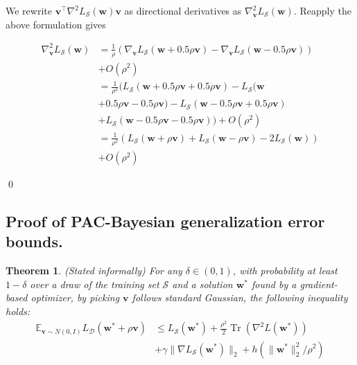 \documentclass[letterpaper]{article} %
\theoremstyle{plain}
\newtheorem{theorem}{Theorem}
\theoremstyle{definition}
\begin{document}
We rewrite $\boldsymbol{v}^{\top} \nabla^2 L_{\mathcal{S}}(\boldsymbol{w}) \boldsymbol{v} $ as directional derivatives as $\nabla_{\boldsymbol{v}}^{2} L_{\mathcal{S}}(\boldsymbol{w})$. Reapply the above formulation gives

\begin{align*}
    \nabla_{\boldsymbol{v}}^{2} L_{\mathcal{S}}(\boldsymbol{w}) &= \frac{1}{\rho} (\nabla_{\boldsymbol{v}} L_{\mathcal{S}}(\boldsymbol{w} + 0.5\rho\boldsymbol{v})- \nabla_{\boldsymbol{v}} L_{\mathcal{S}}(\boldsymbol{w} - 0.5\rho\boldsymbol{v})) \\
    &+O\left(\rho^2\right) \\
    &= \frac{1}{\rho^2} (L_{\mathcal{S}}(\boldsymbol{w} + 0.5\rho\boldsymbol{v}+ 0.5\rho\boldsymbol{v}) - L_{\mathcal{S}}(\boldsymbol{w}\\
    & + 0.5\rho\boldsymbol{v}- 0.5\rho\boldsymbol{v}) - L_{\mathcal{S}}(\boldsymbol{w} - 0.5\rho\boldsymbol{v} + 0.5\rho\boldsymbol{v}) \\
    &+ L_{\mathcal{S}}(\boldsymbol{w} - 0.5\rho\boldsymbol{v} - 0.5\rho\boldsymbol{v}))+O\left(\rho^2\right) \\
    &= \frac{1}{\rho^2} (L_{\mathcal{S}}(\boldsymbol{w} + \rho\boldsymbol{v})+ L_{\mathcal{S}}(\boldsymbol{w} -\rho\boldsymbol{v})- 2L_{\mathcal{S}}(\boldsymbol{w})) \\
    &+O\left(\rho^2\right)
\end{align*}

\qed

\subsection{Proof of PAC-Bayesian generalization error bounds.}
\begin{theorem} \label{theorem:bound}
(Stated informally) For any $\delta \in(0,1)$, with probability at least $1-\delta$ over a draw of the training set $\mathcal{S}$ and a solution $\boldsymbol{w^*}$ found by a gradient-based optimizer, by picking $\boldsymbol{v}$ follows standard Gaussian, the following inequality holds:
\begin{align*}
\mathbb{E}_{\boldsymbol{v} \sim N(0, I)} L_{\mathcal{D}}(\boldsymbol{w^*}+\rho \boldsymbol{v}) &\leq L_{\mathcal{S}}(\boldsymbol{w^*}) + \frac{\rho^2}{2} \operatorname{Tr}\left(\nabla^2 L\left(\boldsymbol{w^*}\right)\right) \\
& + \gamma\|\nabla L_{\mathcal{S}}(\boldsymbol{w^*})\|_2  +
h\left(\|\boldsymbol{w^*}\|_2^2 / \rho^2\right) \nonumber
\end{align*}
\end{theorem}
\end{document}
